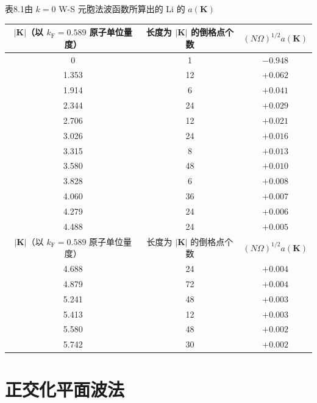 表8.1\quad 由 $k=0$ W-S 元胞法波函数所算出的 Li 的 $a(\boldsymbol{K})$

\begin{center}\small
\begin{tabular}{ccc}
\hline
$|\boldsymbol{K}|$（以 $k_{\mathrm{F}}=0.589$ 原子单位量度） & 长度为 $|\boldsymbol{K}|$ 的倒格点个数 & $(N\Omega)^{1/2}a(\boldsymbol{K})$\\
\hline
0 & 1 & $-0.948$\\
1.353 & 12 & $+0.062$\\
1.914 & 6 & $+0.041$\\
2.344 & 24 & $+0.029$\\
2.706 & 12 & $+0.021$\\
3.026 & 24 & $+0.016$\\
3.315 & 8 & $+0.013$\\
3.580 & 48 & $+0.010$\\
3.828 & 6 & $+0.008$\\
4.060 & 36 & $+0.007$\\
4.279 & 24 & $+0.006$\\
4.488 & 24 & $+0.005$\\
$|\boldsymbol{K}|$（以 $k_{\mathrm{F}}=0.589$ 原子单位量度） & 长度为 $|\boldsymbol{K}|$ 的倒格点个数 & $(N\Omega)^{1/2}a(\boldsymbol{K})$\\
4.688 & 24 & $+0.004$\\
4.879 & 72 & $+0.004$\\
5.241 & 48 & $+0.003$\\
5.413 & 12 & $+0.003$\\
5.580 & 48 & $+0.002$\\
5.742 & 30 & $+0.002$\\
\hline
\end{tabular}
\end{center}

\section{正交化平面波法}

